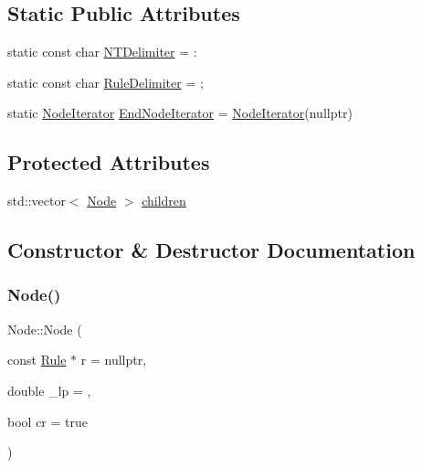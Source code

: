 \subsection*{Static Public Attributes}
\begin{DoxyCompactItemize}
\item 
static const char \hyperlink{class_node_abd26102ffbe2a3e00c34bed5508b3234}{N\+T\+Delimiter} = \textquotesingle{}\+:\textquotesingle{}
\item 
static const char \hyperlink{class_node_ab58932e82964fb75ba806870c4069dc2}{Rule\+Delimiter} = \textquotesingle{};\textquotesingle{}
\item 
static \hyperlink{class_node_1_1_node_iterator}{Node\+Iterator} \hyperlink{class_node_a336943f2e37a2b6fcbe8b47634719dec}{End\+Node\+Iterator} = \hyperlink{class_node_1_1_node_iterator}{Node\+Iterator}(nullptr)
\end{DoxyCompactItemize}
\subsection*{Protected Attributes}
\begin{DoxyCompactItemize}
\item 
std\+::vector$<$ \hyperlink{class_node}{Node} $>$ \hyperlink{class_node_af7ddc81358470c3bf7a7819c8b77f53d}{children}
\end{DoxyCompactItemize}


\subsection{Constructor \& Destructor Documentation}
\mbox{\label{class_node_ae33050869651f64551da2d13ad2a9dbc}} 
\subsubsection{\texorpdfstring{Node()}{Node()}\hspace{0.1cm}{\footnotesize\ttfamily [1/3]}}
{\footnotesize\ttfamily Node\+::\+Node (\begin{DoxyParamCaption}\item[{const \hyperlink{class_rule}{Rule} $\ast$}]{r = {\ttfamily nullptr},  }\item[{double}]{\+\_\+lp = {},  }\item[{bool}]{cr = {\ttfamily true} }\end{DoxyParamCaption})\hspace{0.3cm}{\ttfamily [inline]}}

